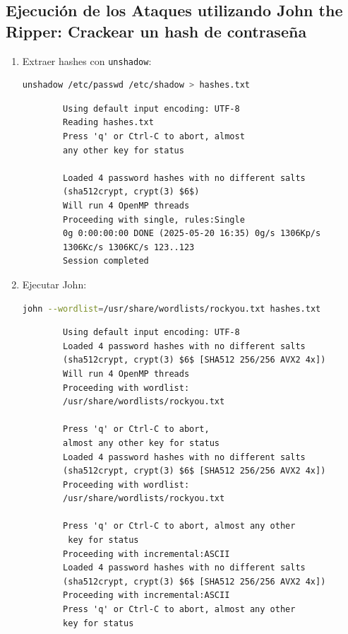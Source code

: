 \documentclass[12pt,a4paper]{article}
\begin{document}
\subsection*{Ejecución de los Ataques utilizando John the Ripper: Crackear un hash de contraseña}
\begin{enumerate}
    \item Extraer hashes con \texttt{unshadow}:
    \begin{lstlisting}[language=bash]
unshadow /etc/passwd /etc/shadow > hashes.txt
    \end{lstlisting}
    \begin{verbatim}
        Using default input encoding: UTF-8
        Reading hashes.txt
        Press 'q' or Ctrl-C to abort, almost 
        any other key for status

        Loaded 4 password hashes with no different salts 
        (sha512crypt, crypt(3) $6$)
        Will run 4 OpenMP threads
        Proceeding with single, rules:Single
        0g 0:00:00:00 DONE (2025-05-20 16:35) 0g/s 1306Kp/s 
        1306Kc/s 1306KC/s 123..123
        Session completed
    \end{verbatim}
    
    \item Ejecutar John:
    \begin{lstlisting}[language=bash]
        john --wordlist=/usr/share/wordlists/rockyou.txt hashes.txt
    \end{lstlisting}
    \begin{verbatim}
        Using default input encoding: UTF-8
        Loaded 4 password hashes with no different salts 
        (sha512crypt, crypt(3) $6$ [SHA512 256/256 AVX2 4x])
        Will run 4 OpenMP threads
        Proceeding with wordlist:
        /usr/share/wordlists/rockyou.txt

        Press 'q' or Ctrl-C to abort, 
        almost any other key for status
        Loaded 4 password hashes with no different salts 
        (sha512crypt, crypt(3) $6$ [SHA512 256/256 AVX2 4x])
        Proceeding with wordlist:
        /usr/share/wordlists/rockyou.txt

        Press 'q' or Ctrl-C to abort, almost any other
         key for status
        Proceeding with incremental:ASCII
        Loaded 4 password hashes with no different salts 
        (sha512crypt, crypt(3) $6$ [SHA512 256/256 AVX2 4x])
        Proceeding with incremental:ASCII
        Press 'q' or Ctrl-C to abort, almost any other 
        key for status
    \end{verbatim}
\end{enumerate}
\end{document}
